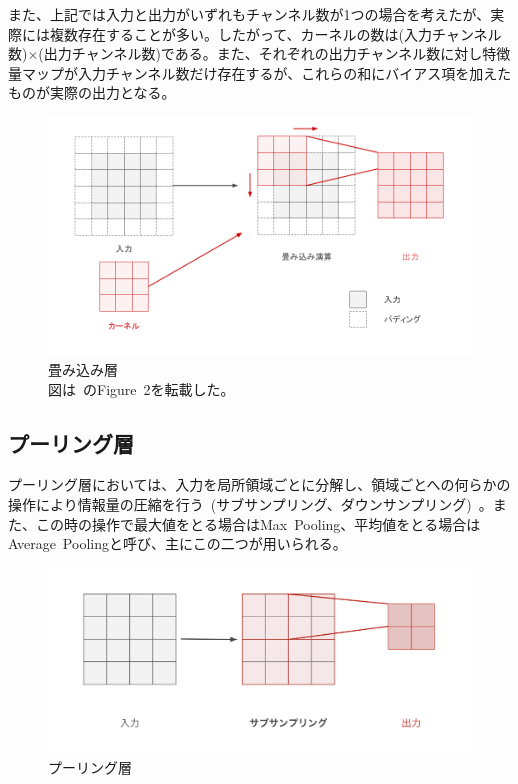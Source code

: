 また、上記では入力と出力がいずれもチャンネル数が1つの場合を考えたが、実際には複数存在することが多い。したがって、カーネルの数は(入力チャンネル数)$\times$(出力チャンネル数)である。また、それぞれの出力チャンネル数に対し特徴量マップが入力チャンネル数だけ存在するが、これらの和にバイアス項を加えたものが実際の出力となる。

\begin{figure}[b]
\centering
\includegraphics[width=\columnwidth]{figure/convolution.png}
\caption[CNNの畳み込み層]{畳み込み層\\
図は~\cite{AlexNet}のFigure~2を転載した。}
\label{fig:conv}
\end{figure}

\clearpage

\subsection{プーリング層}

プーリング層においては、入力を局所領域ごとに分解し、領域ごとへの何らかの操作により情報量の圧縮を行う~(サブサンプリング、ダウンサンプリング)~。また、この時の操作で最大値をとる場合はMax~Pooling、平均値をとる場合はAverage~Poolingと呼び、主にこの二つが用いられる。

\begin{figure}[b]
\centering
\includegraphics[width=\columnwidth]{figure/pooling.png}
\caption[CNNのプーリング層]{プーリング層}
\label{fig:pooling}
\end{figure}

